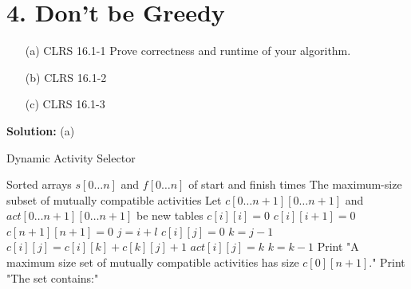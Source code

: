 \documentclass{article}
\begin{document}
\section*{4. Don't be Greedy}
\begin{enumerate}
    \item[(a)] CLRS 16.1-1 Prove correctness and runtime of your algorithm.
    \item[(b)] CLRS 16.1-2
    \item[(c)] CLRS 16.1-3
\end{enumerate}
\textbf{Solution:}
(a)
\begin{algorithm}
\caption{Dynamic Activity Selector}
\begin{algorithmic}[1]
\Require Sorted arrays $s[0 \ldots n]$ and $f[0 \ldots n]$ of start and finish times
\Ensure The maximum-size subset of mutually compatible activities
\State Let $c[0 \ldots n+1][0 \ldots n+1]$ and $act[0 \ldots n+1][0 \ldots n+1]$ be new tables
    \State $c[i][i] = 0$
    \State $c[i][i + 1] = 0$
\EndFor
\State $c[n + 1][n + 1] = 0$
        \State $j = i + l$
        \State $c[i][j] = 0$
        \State $k = j - 1$
                \State $c[i][j] = c[i][k] + c[k][j] + 1$
                \State $act[i][j] = k$
            \EndIf
            \State $k = k - 1$
        \EndWhile
    \EndFor
\EndFor
\State Print "A maximum size set of mutually compatible activities has size $c[0][n + 1]$."
\State Print "The set contains:"
\State {}
\end{algorithmic}
\end{algorithm}
\end{document}
